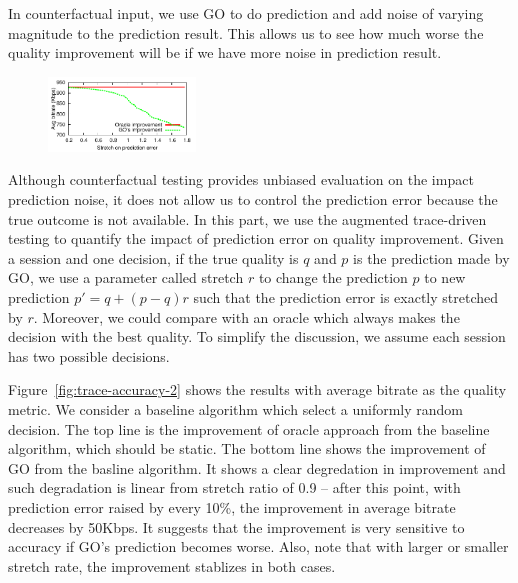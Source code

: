 In counterfactual input, we use GO to do prediction and add noise of varying magnitude to the prediction result. This allows us to see how much worse the quality improvement will be if we have more noise in prediction result. 

\fillme

\begin{figure}[h!]
\centering
 \includegraphics[width=0.35\textwidth] {figures/newfig/trendAccuracy-metricId1-keyGlobal-partition.pdf}
\label{fig:trace-accuracy-1}
\end{figure}


Although counterfactual testing provides unbiased evaluation on the impact prediction noise, it does not allow us to control the prediction error because the true outcome is not available. In this part, we use the augmented trace-driven testing to quantify the impact of prediction error on quality improvement. Given a session and one decision, if the true quality is $q$ and $p$ is the prediction made by GO, we use a parameter called stretch $r$ to change the prediction $p$ to new prediction $p'=q+(p-q)r$ such that the prediction error is exactly stretched by $r$. 
Moreover, we could compare with an oracle which always makes the decision with the best quality. To simplify the discussion, we assume each session has two  possible decisions. 

Figure~\ref{fig:trace-accuracy-2} shows the results with average bitrate as the quality metric. We consider a baseline algorithm which select a uniformly random decision. The top line is the improvement of oracle approach from the baseline algorithm, which should be static. The bottom line shows the improvement of GO from the basline algorithm. 
It shows a clear degredation in improvement and such degradation is linear from stretch ratio of 0.9 -- after this point, with prediction error raised by every 10\%, the improvement in average bitrate decreases by 50Kbps. It suggests that the improvement is very sensitive to accuracy if GO's prediction becomes worse. Also, note that with larger or smaller stretch rate, the improvement stablizes in both cases.


